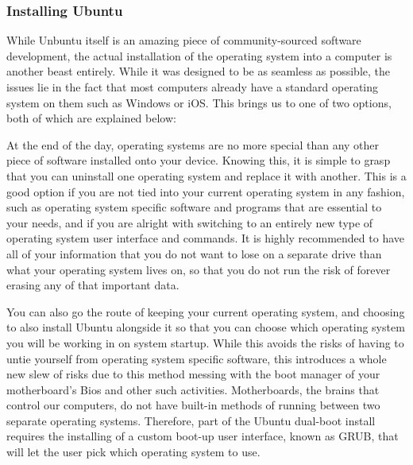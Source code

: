 \documentclass[12pt]{report}
\begin{document}
\subsubsection*{Installing Ubuntu}
While Unbuntu itself is an amazing piece of community-sourced software development, the actual installation of the operating system into a computer is another beast entirely. While it was designed to be as seamless as possible, the issues lie in the fact that most computers already have a standard operating system on them such as Windows or iOS. This brings us to one of two options, both of which are explained below:
\begin{description}[font=$\bullet$~\normalfont\scshape\color{red!50!black}]
	\item [Removing the current operating system and replacing it with Ubuntu] At the end of the day, operating systems are no more special than any other piece of software installed onto your device. Knowing this, it is simple to grasp that you can uninstall one operating system and replace it with another. This is a good option if you are not tied into your current operating system in any fashion, such as operating system specific software and programs that are essential to your needs, and if you are alright with switching to an entirely new type of operating system user interface and commands. It is highly recommended to have all of your information that you do not want to lose on a separate drive than what your operating system lives on, so that you do not run the risk of forever erasing any of that important data.
	\item [Installing Ubuntu beside the current operating sytem with dual-boot] You can also go the route of keeping your current operating system, and choosing to also install Ubuntu alongside it so that you can choose which operating system you will be working in on system startup. While this avoids the risks of having to untie yourself from operating system specific software, this introduces a whole new slew of risks due to this method messing with the boot manager of your motherboard's Bios and other such activities. Motherboards, the brains that control our computers, do not have built-in methods of running between two separate operating systems. Therefore, part of the Ubuntu dual-boot install requires the installing of a custom boot-up user interface, known as GRUB, that will let the user pick which operating system to use. 
\end{description}
\end{document}

